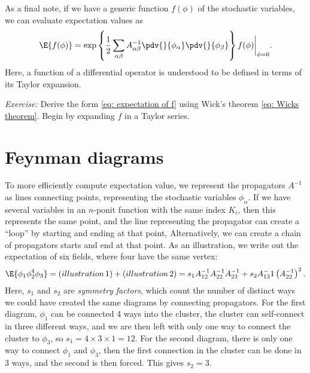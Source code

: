 As a final note, if we have a generic function $f(\phi)$ of the stochastic variables, we can evaluate expectation values as
%
\begin{align}\label{eq: expectation of f}
    \E{f(\phi)} 
    = \exp 
    \left\{ 
        \frac{ 1 }{ 2 } \sum_{\alpha \beta} A^{-1}_{\alpha \beta} \pdv{  }{ \phi_\alpha } \pdv{  }{ \phi_\beta } 
    \right\} f(\phi) \bigg|_{\phi = 0}.
\end{align}
%
Here, a function of a differential operator is understood to be defined in terms of its Taylor expansion.
\begin{framed}\noindent
    \textit{Exercise:} 
    Derive the form \autoref{eq: expectation of f} using Wick's theorem \autoref{eq: Wicks theorem}.
    Begin by expanding $f$ in a Taylor series.
\end{framed}


\section{Feynman diagrams}

To more efficiently compute expectation value, we represent the propagators $A^{-1}$as lines connecting points, representing the stochastic variables $\phi_\alpha$.
If we have several variables in an $n$-ponit function with the same index $K_i$, then this represents the same point, and the line representing the propagator can create a ``loop'' by starting and ending at that point, 
Alternatively, we can create a chain of propagators starts and end at that point.
As an illustration, we write out the expectation of six fields, where four have the same vertex:
%
\begin{align}
    \E{\phi_1 \phi_2^4 \phi_3} 
    = (illustration\,1) + (illustration\,2)
    = 
    s_1 A_{12}^{-1} A_{22}^{-1} A_{23}^{-1}
    +s_2 A_{13}^-1 \left( A_{22}^{-1} \right)^2.
\end{align}
%
Here, $s_1$ and $s_2$ are \emph{symmetry factors}, which count the number of distinct ways we could have created the same diagrams by connecting propagators.
For the first diagram, $\phi_1$ can be connected 4 ways into the cluster, the cluster can self-connect in three different ways, and we are then left with only one way to connect the cluster to $\phi_3$, so $s_1 = 4 \times 3 \times 1 = 12$.
For the second diagram, there is only one way to connect $\phi_1$ and $\phi_3$, then the first connection in the cluster can be done in $3$ ways, and the second is then forced.
This gives $s_2 = 3$.

